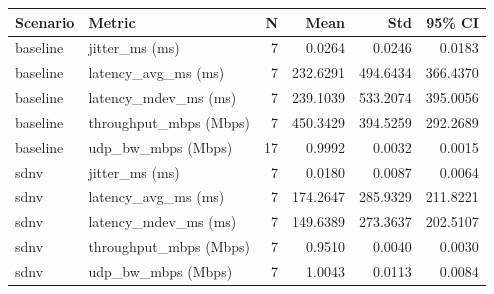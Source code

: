 \begin{tabular}{llrrrr}
Scenario & Metric & N & Mean & Std & 95\% CI\\
\hline
baseline & jitter_ms (ms) & 7 & 0.0264 & 0.0246 & 0.0183\\
baseline & latency_avg_ms (ms) & 7 & 232.6291 & 494.6434 & 366.4370\\
baseline & latency_mdev_ms (ms) & 7 & 239.1039 & 533.2074 & 395.0056\\
baseline & throughput_mbps (Mbps) & 7 & 450.3429 & 394.5259 & 292.2689\\
baseline & udp_bw_mbps (Mbps) & 17 & 0.9992 & 0.0032 & 0.0015\\
sdnv & jitter_ms (ms) & 7 & 0.0180 & 0.0087 & 0.0064\\
sdnv & latency_avg_ms (ms) & 7 & 174.2647 & 285.9329 & 211.8221\\
sdnv & latency_mdev_ms (ms) & 7 & 149.6389 & 273.3637 & 202.5107\\
sdnv & throughput_mbps (Mbps) & 7 & 0.9510 & 0.0040 & 0.0030\\
sdnv & udp_bw_mbps (Mbps) & 7 & 1.0043 & 0.0113 & 0.0084\\
\end{tabular}
